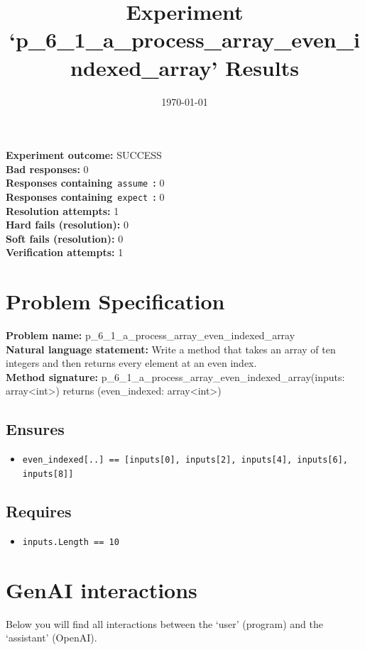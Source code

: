 \documentclass{article}
\begin{document}
\title{Experiment `p\_6\_1\_a\_process\_array\_even\_indexed\_array' Results}
\author{\today}
\date{}
\maketitle
\textbf{Experiment outcome: }SUCCESS
\\\textbf{Bad responses: }0
\\\textbf{Responses containing}~\texttt{assume}~\textbf{: }0
\\\textbf{Responses containing}~\texttt{expect}~\textbf{: }0
\\\textbf{Resolution attempts: }1
\\\textbf{Hard fails (resolution): }0
\\\textbf{Soft fails (resolution): }0
\\\textbf{Verification attempts: }1
\section*{Problem Specification}
\textbf{Problem name: }p\_6\_1\_a\_process\_array\_even\_indexed\_array
\\\textbf{Natural language statement: }Write a method that takes an array of ten integers and then returns every element at an even index.
\\\textbf{Method signature: }p\_6\_1\_a\_process\_array\_even\_indexed\_array(inputs: array<int>) returns (even\_indexed: array<int>)
\subsection*{Ensures}
\begin{itemize}
\item \texttt{even\_indexed[..] == [inputs[0], inputs[2], inputs[4], inputs[6], inputs[8]]}
\end{itemize}
\subsection*{Requires}
\begin{itemize}
\item \texttt{inputs.Length == 10}
\end{itemize}
\clearpage
\section*{GenAI interactions}
Below you will find all interactions between the `user' (program) and the `assistant' (OpenAI).
\end{document}
